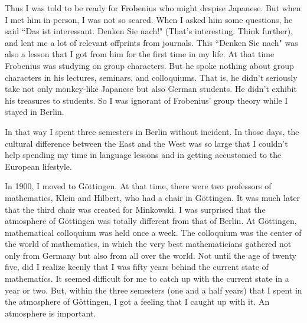 \documentclass[11pt,a4j,twocolumn]{jarticle}
\begin{document}
Thus I was told to be ready for Frobenius who might despise Japanese.
But when I met him in person, I was not so scared.
When I asked him some questions, 
he said ``Das ist interessant. Denken Sie nach!" (That's interesting. Think further),
and lent me a lot of relevant offprints from journals.
This ``Denken Sie nach" was also a lesson that I got from him for the first time in my life.
At that time Frobenius was studying on group characters.
But he spoke nothing about group characters in his lectures, seminars, and colloquiums.
That is, he didn't seriously take not only monkey-like Japanese but also German students.
He didn't exhibit his treasures to students.
So I was ignorant of Frobenius' group theory while I stayed in Berlin.

In that way I spent three semesters in Berlin without incident.
In those days, the cultural difference between the East and the West was so large that
I couldn't help spending my time in language lessons and
in getting accustomed to the European lifestyle.

In 1900, I moved to G\"ottingen.
At that time, there were two professors of mathematics, Klein and Hilbert, who had a chair in G\"ottingen.
It was much later that the third chair was created for Minkowski.
I was surprised that the atmosphere of G\"ottingen was totally different from that of Berlin.
At G\"ottingen, mathematical colloquium was held once a week.
The colloquium was the center of the world of mathematics,
in which the very best mathematicians gathered not only from Germany but also from all over the world.
Not until the age of twenty five, did I realize keenly that I was fifty years behind 
the current state of mathematics.
It seemed difficult for me to catch up with the current state in a year or two.
But, within the three semesters (one and a half years) that
I spent in the atmosphere of G\"ottingen, I got a feeling that I caught up with it.
An atmosphere is important.
\end{document}
